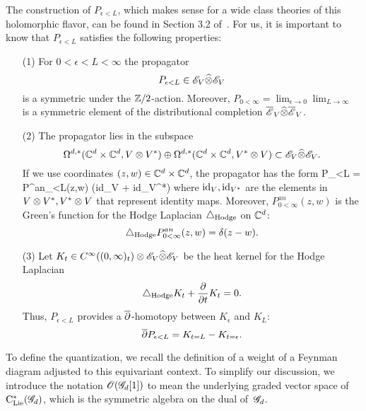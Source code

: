 The construction of $P_{\epsilon<L}$, which makes sense for a wide class theories of this holomorphic flavor, can be found in Section 3.2 of~\cite{BWhol}.
For us, it is important to know that $P_{\epsilon<L}$ satisfies the following properties:

\begin{enumerate}
\item[(1)] For $0 < \epsilon < L < \infty$ the propagator 
\[
P_{\epsilon < L} \in \mathscr E_V \widehat{\otimes} \mathscr E_V 
\]
is a symmetric under the $\mathbb Z/2$-action.
Moreover, $P_{0 < \infty} = \lim_{\epsilon \to 0}\lim_{L \to \infty}$ is a symmetric element of the distributional completion $\overline{\mathscr E}_V \widehat{\otimes} \overline{\mathscr E}_V$. 

\item[(2)] 
The propagator lies in the subspace
\[
\Omega^{d,*}(\mathbb C^d \times \mathbb C^d, V \otimes V^*) \oplus \Omega^{d,*}(\mathbb C^d \times \mathbb C^d, V^* \otimes V) \subset \mathscr E_V \widehat{\otimes} \mathscr E_V .
\]
If we use coordinates $(z,w) \in \mathbb C^d \times \mathbb C^d$, the propagator has the form
\beqn
P_{\epsilon<L} = P^{an}_{\epsilon<L}(z,w) \tensor \left({\rm id}_{V} + {\rm id}_{V^*}\right)
\eeqn
where ${\rm id}_V, {\rm id}_{V^*}$ are the elements in $V \otimes V^*, V^* \otimes V$ that represent identity maps. 
Moreover, $P^{an}_{0 < \infty} (z,w)$ is the Green's function for the Hodge Laplacian $\triangle_{\rm Hodge}$ on $\mathbb C^d$:
\[
\triangle_{\rm Hodge} P^{an}_{0<\infty} (z,w) = \delta (z-w) .
\]

\item[(3)] Let $K_t \in C^\infty((0,\infty)_t) \otimes \mathscr E_V \widehat{\otimes} \mathscr E_V$ be the heat kernel for the Hodge Laplacian
\[
\triangle_{\rm Hodge} K_t + \frac{\partial}{\partial t} K_t = 0 .
\]
Thus, $P_{\epsilon < L}$ provides a $\overline{\partial}$-homotopy between $K_\epsilon$ and $K_L$:
\[
\overline{\partial} P_{\epsilon < L} = K_{t=L} - K_{t=\epsilon} .
\]
\end{enumerate}


To define the quantization, we recall the definition of a weight of a Feynman diagram adjusted to this equivariant context.
To simplify our discussion, we introduce the notation $\mathscr O(\mathscr G_d[1])$ to mean the underlying graded vector space of ${\rm C}_{{\rm Lie}}^*(\mathscr G_d)$, which is the  symmetric algebra on the dual of~$\mathscr G_d$. 

